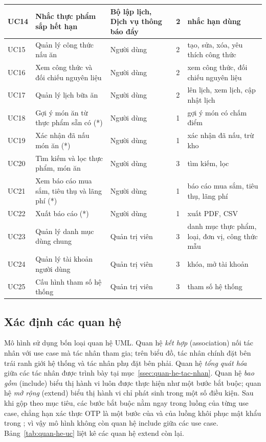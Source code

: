 {\begin{longtable}{|C{1.1cm}|L{4.6cm}|L{3.6cm}|C{0.9cm}|L{\dimexpr{}\arrayrulewidth-1.1cm-4.6cm-3.6cm-0.9cm\relax}|}
UC14 & Nhắc thực phẩm sắp hết hạn & Bộ lập lịch, Dịch vụ thông báo đẩy & 2 & nhắc hạn dùng\\ \hline
UC15 & Quản lý công thức nấu ăn & Người dùng & 2 & tạo, sửa, xóa, yêu thích công thức\\ \hline
UC16 & Xem công thức và đối chiếu nguyên liệu & Người dùng & 2 & xem công thức, đối chiếu nguyên liệu\\ \hline
UC17 & Quản lý lịch bữa ăn & Người dùng & 2 & lên lịch, xem lịch, cập nhật lịch\\ \hline
UC18 & Gợi ý món ăn từ thực phẩm sẵn có (*) & Người dùng & 1 & gợi ý món có chấm điểm\\ \hline
UC19 & Xác nhận đã nấu món ăn (*) & Người dùng & 1 & xác nhận đã nấu, trừ kho\\ \hline
UC20 & Tìm kiếm và lọc thực phẩm, món ăn & Người dùng & 3 & tìm kiếm, lọc\\ \hline
UC21 & Xem báo cáo mua sắm, tiêu thụ và lãng phí (*) & Người dùng & 1 & báo cáo mua sắm, tiêu thụ, lãng phí\\ \hline
UC22 & Xuất báo cáo (*) & Người dùng & 1 & xuất PDF, CSV\\ \hline
UC23 & Quản lý danh mục dùng chung & Quản trị viên & 3 & danh mục thực phẩm, loại, đơn vị, công thức mẫu\\ \hline
UC24 & Quản lý tài khoản người dùng & Quản trị viên & 3 & khóa, mở tài khoản\\ \hline
UC25 & Cấu hình tham số hệ thống & Quản trị viên & 3 & tham số hệ thống\\ \hline
\end{longtable}
}

\subsection{Xác định các quan hệ}\label{ssec:quan-he-uc}

Mô hình sử dụng bốn loại quan hệ UML. Quan hệ \emph{kết hợp} (association) nối tác nhân với use case mà tác nhân tham gia; trên biểu đồ, tác nhân chính đặt bên trái ranh giới hệ thống và tác nhân phụ đặt bên phải. Quan hệ \emph{tổng quát hóa} giữa các tác nhân được trình bày tại mục~\ref{ssec:quan-he-tac-nhan}. Quan hệ \emph{bao gồm} (include) biểu thị hành vi luôn được thực hiện như một bước bắt buộc; quan hệ \emph{mở rộng} (extend) biểu thị hành vi chỉ phát sinh trong một số điều kiện. Sau khi gộp theo mục tiêu, các bước bắt buộc nằm ngay trong luồng của từng use case, chẳng hạn xác thực OTP là một bước của  và của luồng khôi phục mật khẩu trong ; vì vậy mô hình không còn quan hệ include giữa các use case. Bảng~\ref{tab:quan-he-uc} liệt kê các quan hệ extend còn lại.

